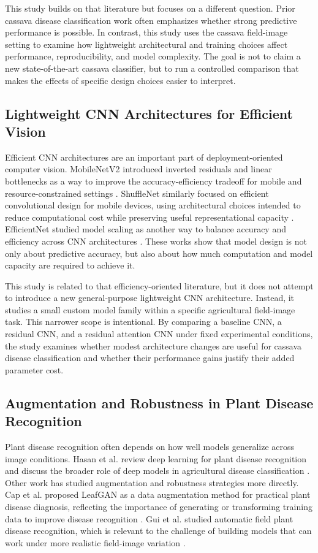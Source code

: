 \documentclass[11pt]{article}
\begin{document}
This study builds on that literature but focuses on a different question. Prior cassava disease classification work often emphasizes whether strong predictive performance is possible. In contrast, this study uses the cassava field-image setting to examine how lightweight architectural and training choices affect performance, reproducibility, and model complexity. The goal is not to claim a new state-of-the-art cassava classifier, but to run a controlled comparison that makes the effects of specific design choices easier to interpret.

\subsection{Lightweight CNN Architectures for Efficient Vision}

Efficient CNN architectures are an important part of deployment-oriented computer vision. MobileNetV2 introduced inverted residuals and linear bottlenecks as a way to improve the accuracy-efficiency tradeoff for mobile and resource-constrained settings \cite{sandler2018}. ShuffleNet similarly focused on efficient convolutional design for mobile devices, using architectural choices intended to reduce computational cost while preserving useful representational capacity \cite{zhang2018}. EfficientNet studied model scaling as another way to balance accuracy and efficiency across CNN architectures \cite{tan2019}. These works show that model design is not only about predictive accuracy, but also about how much computation and model capacity are required to achieve it.

This study is related to that efficiency-oriented literature, but it does not attempt to introduce a new general-purpose lightweight CNN architecture. Instead, it studies a small custom model family within a specific agricultural field-image task. This narrower scope is intentional. By comparing a baseline CNN, a residual CNN, and a residual attention CNN under fixed experimental conditions, the study examines whether modest architecture changes are useful for cassava disease classification and whether their performance gains justify their added parameter cost.

\subsection{Augmentation and Robustness in Plant Disease Recognition}

Plant disease recognition often depends on how well models generalize across image conditions. Hasan et al. review deep learning for plant disease recognition and discuss the broader role of deep models in agricultural disease classification \cite{hasan2020}. Other work has studied augmentation and robustness strategies more directly. Cap et al. proposed LeafGAN as a data augmentation method for practical plant disease diagnosis, reflecting the importance of generating or transforming training data to improve disease recognition \cite{cap2020}. Gui et al. studied automatic field plant disease recognition, which is relevant to the challenge of building models that can work under more realistic field-image variation \cite{gui2021}.
\end{document}
